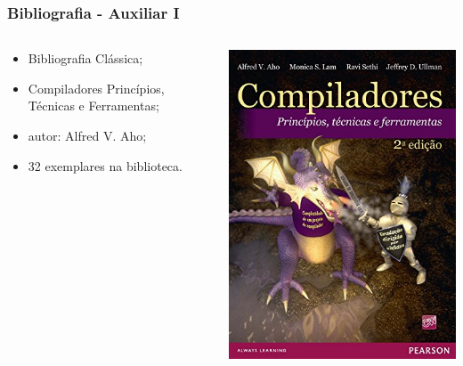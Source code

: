 \documentclass[table]{beamer}
\begin{document}
\begin{frame}
   \frametitle{Bibliografia - Auxiliar I}
   \begin{columns}
      \begin{column}{0.5\textwidth}
         \begin{itemize}
	    \item Bibliografia Clássica;
	    \item Compiladores Princípios, Técnicas e Ferramentas;
	    \item autor: Alfred V. Aho;
	    \item 32 exemplares na biblioteca.
	 \end{itemize}
      \end{column}
      \begin{column}{0.5\textwidth}
      \includegraphics[scale=0.4]{figuras/livro_dragao.jpg}
      \end{column}
   \end{columns}
\end{frame}
\end{document}
